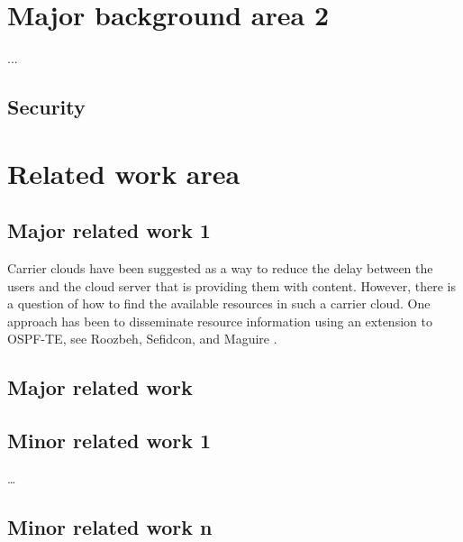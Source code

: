 
\section{Major background area 2} %
...
\subsection{ Security}%

\section{Related work area} %


\subsection{Major related work 1} %
Carrier clouds have been suggested as a way to reduce the delay between the users and the cloud server that is providing them with content. However, there is a question of how to find the available resources in such a carrier cloud. One approach has been to disseminate resource information using an extension to OSPF-TE, see Roozbeh, Sefidcon, and Maguire \cite{roozbeh_resource_2013}.


\subsection{Major related work} %

\subsection{Minor related work 1} %


…
\subsection{Minor related work n} %

